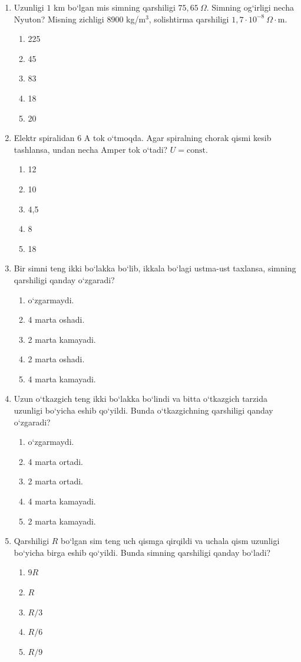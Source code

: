 \begin{enumerate}
\item Uzunligi $1$ km bo‘lgan mis simning qarshiligi $75,65~\Omega$. Simning og‘irligi necha Nyuton? Misning zichligi $8900$ kg/m$^3$, solishtirma qarshiligi $1,7\cdot10^{-8}~\Omega\cdot$m.
\begin{enumerate}[label=\Alph*)]
\item 225
\item 45
\item 83
\item 18
\item 20
\end{enumerate}

\item Elektr spiralidan $6$ A tok o‘tmoqda. Agar spiralning chorak qismi kesib tashlansa, undan necha Amper tok o‘tadi? $U=\text{const}$.
\begin{enumerate}[label=\Alph*)]
\item 12
\item 10
\item 4,5
\item 8
\item 18
\end{enumerate}

\item Bir simni teng ikki bo‘lakka bo‘lib, ikkala bo‘lagi ustma-ust taxlansa, simning qarshiligi qanday o‘zgaradi?
\begin{enumerate}[label=\Alph*)]
\item o‘zgarmaydi.
\item 4 marta oshadi.
\item 2 marta kamayadi.
\item 2 marta oshadi.
\item 4 marta kamayadi.
\end{enumerate}

\item Uzun o‘tkazgich teng ikki bo‘lakka bo‘lindi va bitta o‘tkazgich tarzida uzunligi bo‘yicha eshib qo‘yildi. Bunda o‘tkazgichning qarshiligi qanday o‘zgaradi?
\begin{enumerate}[label=\Alph*)]
\item o‘zgarmaydi.
\item 4 marta ortadi.
\item 2 marta ortadi.
\item 4 marta kamayadi.
\item 2 marta kamayadi.
\end{enumerate}

\item Qarshiligi $R$ bo‘lgan sim teng uch qismga qirqildi va uchala qism uzunligi bo‘yicha birga eshib qo‘yildi. Bunda simning qarshiligi qanday bo‘ladi?
\begin{enumerate}[label=\Alph*)]
\item $9R$
\item $R$
\item $R/3$
\item $R/6$
\item $R/9$
\end{enumerate}



\end{enumerate}
